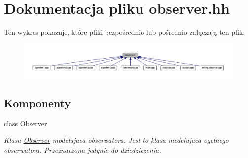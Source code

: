 \hypertarget{observer_8hh}{\section{Dokumentacja pliku observer.\-hh}
\label{observer_8hh}
}
Ten wykres pokazuje, które pliki bezpośrednio lub pośrednio załączają ten plik\-:
\nopagebreak
\begin{figure}[H]
\begin{center}
\leavevmode
\includegraphics[width=350pt]{observer_8hh__dep__incl}
\end{center}
\end{figure}
\subsection*{Komponenty}
\begin{DoxyCompactItemize}
\item 
class \hyperlink{class_observer}{Observer}
\begin{DoxyCompactList}\small\item\em Klasa \hyperlink{class_observer}{Observer} modelujaca obserwatora. Jest to klasa modelujaca ogolnego obserwatora. Przeznaczona jedynie do dziedziczenia. \end{DoxyCompactList}\end{DoxyCompactItemize}

